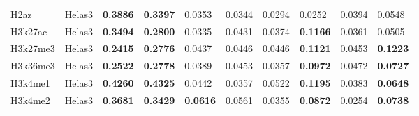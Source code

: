 \begin{table}[!ht]
\begin{tabular}{ll|ll|ll|ll|ll}
H2az                                 & Helas3                                 & {\color[HTML]{CB0000} \textbf{0.3886}}                       & {\color[HTML]{CB0000} \textbf{0.3397}}                      & 0.0353                                & 0.0344                               & 0.0294                                & 0.0252                                 & 0.0394                                & 0.0548                                 \\
H3k27ac                              & Helas3                                 & {\color[HTML]{CB0000} \textbf{0.3494}}                       & {\color[HTML]{CB0000} \textbf{0.2800}}                      & 0.0335                                & 0.0431                               & 0.0374                                & {\color[HTML]{CB0000} \textbf{0.1166}} & 0.0361                                & 0.0505                                 \\
H3k27me3                             & Helas3                                 & {\color[HTML]{CB0000} \textbf{0.2415}}                       & {\color[HTML]{CB0000} \textbf{0.2776}}                      & 0.0437                                & 0.0446                               & 0.0446                                & {\color[HTML]{CB0000} \textbf{0.1121}} & 0.0453                                & {\color[HTML]{CB0000} \textbf{0.1223}} \\
H3k36me3                             & Helas3                                 & {\color[HTML]{CB0000} \textbf{0.2522}}                       & {\color[HTML]{CB0000} \textbf{0.2778}}                      & 0.0389                                & 0.0453                               & 0.0357                                & \textbf{0.0972}                        & 0.0472                                & \textbf{0.0727}                        \\
H3k4me1                              & Helas3                                 & {\color[HTML]{CB0000} \textbf{0.4260}}                       & {\color[HTML]{CB0000} \textbf{0.4325}}                      & 0.0442                                & 0.0357                               & 0.0522                                & {\color[HTML]{CB0000} \textbf{0.1195}} & 0.0383                                & \textbf{0.0648}                        \\
H3k4me2                              & Helas3                                 & {\color[HTML]{CB0000} \textbf{0.3681}}                       & {\color[HTML]{CB0000} \textbf{0.3429}}                      & \textbf{0.0616}                       & 0.0561                               & 0.0355                                & \textbf{0.0872}                        & 0.0254                                & \textbf{0.0738}                        \\

\end{tabular}
\end{table}
